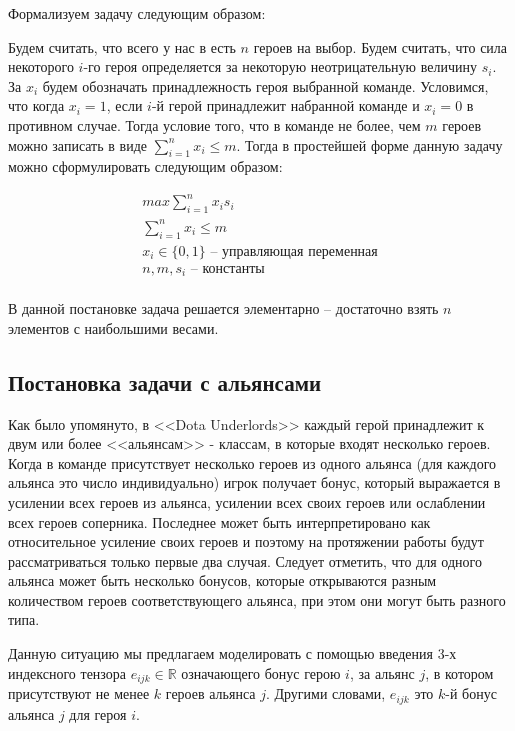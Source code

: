 \documentclass{article}
\begin{document}
Формализуем задачу следующим образом:

Будем считать, что всего у нас в есть $n$ героев на выбор. Будем считать, что сила некоторого $i$-го героя определяется за некоторую неотрицательную величину $s_i$. За $x_i$ будем обозначать принадлежность героя выбранной команде. Условимся, что когда $x_i = 1$, если $i$-й герой принадлежит набранной команде и $x_i=0$ в противном случае. Тогда условие того, что в команде не более, чем $m$ героев можно записать в виде $\sum_{i=1}^n x_i \leq m$. Тогда в простейшей форме данную задачу можно сформулировать следующим образом:

\begin{equation}
\begin{gathered}
    max \sum_{i=1}^n x_i s_i \\
    \sum_{i=1}^n x_i \leq m \\
    x_i \in \{0, 1\} \text{ – управляющая переменная} \\
   n, m, s_i \text{ – константы}  \\
\end{gathered}
\end{equation}

В данной постановке задача решается элементарно – достаточно взять $n$ элементов с наибольшими весами.

\subsection{Постановка задачи с альянсами}
Как было упомянуто, в <<Dota Underlords>>  каждый герой принадлежит к двум или более <<альянсам>> - классам, в которые входят несколько героев.  Когда в команде присутствует несколько героев из одного альянса (для каждого альянса это число индивидуально) игрок получает бонус, который выражается в усилении всех героев из альянса, усилении всех своих героев или ослаблении всех героев соперника. Последнее может быть интерпретировано как относительное усиление своих героев и поэтому на протяжении работы будут рассматриваться только первые два случая. Следует отметить, что для одного альянса может быть несколько бонусов, которые открываются разным количеством героев соответствующего альянса, при этом они могут быть разного типа.


Данную ситуацию мы предлагаем моделировать с помощью введения 3-х индексного тензора $e_{ijk} \in \mathbb{R}$ означающего бонус герою $i$, за альянс $j$, в котором присутствуют не менее $k$ героев альянса $j$. Другими словами, $e_{ijk}$ это $k$-й бонус альянса $j$ для героя $i$.
\end{document}
